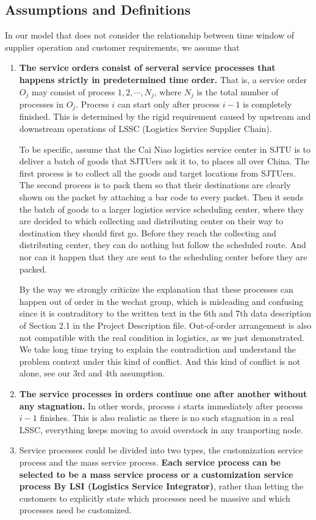 \documentclass{llncs}
\begin{document}
\subsection{Assumptions and Definitions}
In our model that does not consider the relationship between time window of supplier operation and customer requirements, we assume that
\begin{enumerate}
    \item \textbf{The service orders consist of serveral service processes that happens strictly in predetermined time order.} That is, a service order $O_j$ may consist of process $1,2,\cdots,N_j$, where $N_j$ is the total number of processes in $O_j$. Process $i$ can start only after process $i-1$ is completely finished. This is determined by the
    rigid requirement caused by upstream and downstream operations of LSSC (Logistics Service Supplier Chain). 
    
    To be specific, assume that the Cai Niao logistics service center in SJTU is to deliver a batch of goods that SJTUers ask it to, to places all over China. The first process is to collect all the goods and target locations from SJTUers. The second process is to pack them so that their destinations are clearly shown on the packet by attaching a bar code to every packet. Then it sends the batch of goods to a larger logistics service scheduling center, where they are decided to which collecting and distributing center on their way to destination they should first go. Before they reach the collecting and distributing center, they can do nothing but follow the scheduled route. And nor can it happen that they are sent to the scheduling center before they are packed.

    By the way we strongly criticize the explanation that these processes can happen out of order in the wechat group, which is misleading and confusing since it is contraditory to the written text in the 6th and 7th data description of Section 2.1 in the Project Description file. Out-of-order arrangement is also not compatible with the real condition in logistics, as we just demonstrated. We take long time trying to explain the contradiction and understand the problem context under this kind of conflict. And this kind of conflict is not alone, see our 3rd and 4th assumption.
    \item \textbf{The service processes in orders continue one after another without any stagnation.} In other words, process $i$ starts immediately after process $i-1$ finishes. This is also realistic as there is no such stagnation in a real LSSC, everything keeps moving to avoid overstock in any tranporting node. 
    \item Service processes could be divided into two types, the customization service process and the mass service process.
    \textbf{Each service process can be selected to be a mass service process or a customization service process By LSI (Logistics Service Integrator)}, rather than letting the customers to explicitly state which processes need be massive and which processes need be customized.


\end{enumerate}
\end{document}
